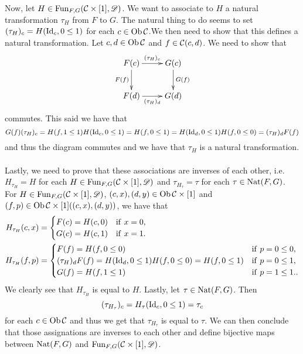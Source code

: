 \documentclass[11pt, a4paper, twoside]{article}
\begin{document}
Now, let $H\in\operatorname{Fun}_{F,G}(\mathcal{C}\times[1],\mathscr D)$. We want to associate to $H$ a natural transformation $\tau_H$ from $F$ to $G$. The natural thing to do seems to set $(\tau_H)_c=H(\mathrm{Id}_c,0\leq1)$ for each $c\in\operatorname{Ob}\mathcal{C}$.We then need to show that this defines a natural transformation. Let $c,d\in\operatorname{Ob}\mathcal{C}$ and $f\in\mathcal{C}(c,d)$. We need to show that 
	\begin{displaymath}
		\xymatrix{
			F(c) \ar[r]^{(\tau_H)_c} \ar[d]_{F(f)} & G(c) \ar[d]^{G(f)}\\
			F(d) \ar[r]_{(\tau_H)_d} & G(d)
		}
	\end{displaymath}
commutes. This said we have that 
	\begin{displaymath}
		G(f)(\tau_H)_c=H(f,1\leq1)H(\mathrm{Id}_c,0\leq1)=H(f,0\leq1)=H(\mathrm{Id}_d,0\leq1)H(f,0\leq0)=(\tau_H)_dF(f)
	\end{displaymath} 
and thus the diagram commutes and we have that $\tau_H$ is a natural transformation.\\\\
Lastly, we need to prove that these associations are inverses of each other, i.e. $H_{\tau_H}=H$ for each $H\in\operatorname{Fun}_{F,G}(\mathcal{C}\times[1],\mathscr D)$ and $\tau_{H_\tau}=\tau$ for each $\tau\in\operatorname{Nat}(F,G)$. For $H\in\operatorname{Fun}_{F,G}(\mathcal{C}\times[1],\mathscr D)$, $(c,x),(d,y)\in\operatorname{Ob}\mathcal{C}\times[1]$ and $(f,p)\in\operatorname{Ob}\mathcal{C}\times[1]((c,x),(d,y))$, we have that 
	\begin{align*}
		H_{\tau_H}(c,x) &=
			\begin{cases}
				F(c)=H(c,0) & \mathrm{if}\ x=0,\\
				G(c)=H(c,1) & \mathrm{if}\ x=1.
			\end{cases}\\
		H_{\tau_H}(f,p) &=
			\begin{cases}
				F(f) = H(f,0\leq0) & \mathrm{if}\ p=0\leq0,\\
				(\tau_H)_dF(f)=H(\mathrm{Id}_d,0\leq1)H(f,0\leq0)=H(f,0\leq1) & \mathrm{if}\ p=0\leq1,\\
				G(f)  = H(f,1\leq1) & \mathrm{if}\ p=1\leq1..
			\end{cases}
		\end{align*}
	We clearly see that $H_{\tau_H}$ is equal to $H$. Lastly, let $\tau\in\operatorname{Nat}(F,G)$. Then 
		\begin{displaymath}
			(\tau_{H_\tau})_c=H_\tau(\mathrm{Id}_c,0\leq1)=\tau_c
		\end{displaymath}
			for each $c\in\operatorname{Ob}\mathcal{C}$ and thus we get that $\tau_{H_\tau}$ is equal to $\tau$. We can then conclude that those assignations are inverses to each other and define bijective maps between $\operatorname{Nat}(F,G)$ and $\operatorname{Fun}_{F,G}(\mathcal{C}\times[1],\mathscr D)$.
	
\end{document}
